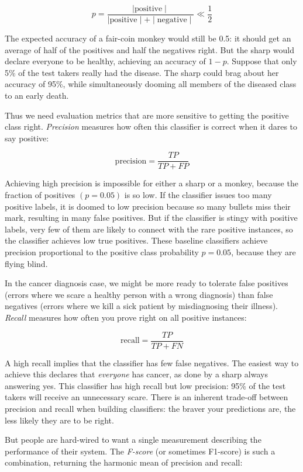 \documentclass[10pt]{article}
\begin{document}
\[ p = \frac{\mid \text{positive} \mid}{\mid \text{positive} \mid + \mid \text{negative} \mid} \ll \frac{1}{2} \]

The expected accuracy of a fair-coin monkey would still be 0.5: it should get an average of half of the positives and half the negatives right. But the sharp would declare everyone to be healthy, achieving an accuracy of \(1 - p\). Suppose that only 5\% of the test takers really had the disease. The sharp could brag about her accuracy of 95\%, while simultaneously dooming all members of the diseased class to an early death.

Thus we need evaluation metrics that are more sensitive to getting the positive class right. \textit{Precision} measures how often this classifier is correct when it dares to say positive:

\[
\text{precision} = \frac{TP}{TP + FP}
\]

Achieving high precision is impossible for either a sharp or a monkey, because the fraction of positives \((p = 0.05)\) is so low. If the classifier issues too many positive labels, it is doomed to low precision because so many bullets miss their mark, resulting in many false positives. But if the classifier is stingy with positive labels, very few of them are likely to connect with the rare positive instances, so the classifier achieves low true positives. These baseline classifiers achieve precision proportional to the positive class probability \(p = 0.05\), because they are flying blind.

In the cancer diagnosis case, we might be more ready to tolerate false positives (errors where we scare a healthy person with a wrong diagnosis) than false negatives (errors where we kill a sick patient by misdiagnosing their illness). \textit{Recall} measures how often you prove right on all positive instances:

\[
\text{recall} = \frac{TP}{TP + FN}
\]

A high recall implies that the classifier has few false negatives. The easiest way to achieve this declares that \textit{everyone} has cancer, as done by a sharp always answering yes. This classifier has high recall but low precision: 95\% of the test takers will receive an unnecessary scare. There is an inherent trade-off between precision and recall when building classifiers: the braver your predictions are, the less likely they are to be right.

But people are hard-wired to want a single measurement describing the performance of their system. The \textit{F-score} (or sometimes F1-score) is such a combination, returning the harmonic mean of precision and recall:
\end{document}
